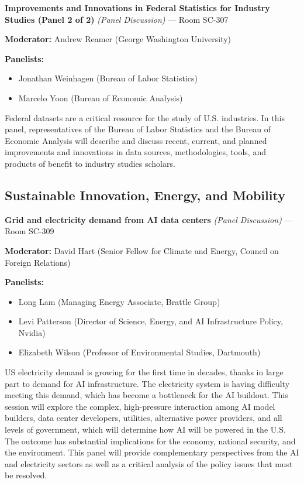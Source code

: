 \documentclass[
  10pt,
  letterpaper,
  DIV=11,
  numbers=noendperiod]{scrartcl}
\providecommand{\tightlist}{%
  \setlength{\itemsep}{0pt}\setlength{\parskip}{0pt}}\usepackage{longtable,booktabs,array}
\begin{document}
\textbf{Improvements and Innovations in Federal Statistics for Industry
Studies (Panel 2 of 2)} \emph{(Panel Discussion)} --- Room SC-307

\textbf{Moderator:} Andrew Reamer (George Washington University)

\textbf{Panelists:}

\begin{itemize}
\tightlist
\item
  Jonathan Weinhagen (Bureau of Labor Statistics)
\item
  Marcelo Yoon (Bureau of Economic Analysis)
\end{itemize}

Federal datasets are a critical resource for the study of U.S.
industries. In this panel, representatives of the Bureau of Labor
Statistics and the Bureau of Economic Analysis will describe and discuss
recent, current, and planned improvements and innovations in data
sources, methodologies, tools, and products of benefit to industry
studies scholars.

\subsection{\texorpdfstring{\textcolor{sustainability}{Sustainable Innovation, Energy, and Mobility}}{}}\label{section-39}

\textbf{Grid and electricity demand from AI data centers} \emph{(Panel
Discussion)} --- Room SC-309

\textbf{Moderator:} David Hart (Senior Fellow for Climate and Energy,
Council on Foreign Relations)

\textbf{Panelists:}

\begin{itemize}
\tightlist
\item
  Long Lam (Managing Energy Associate, Brattle Group)
\item
  Levi Patterson (Director of Science, Energy, and AI Infrastructure
  Policy, Nvidia)
\item
  Elizabeth Wilson (Professor of Environmental Studies, Dartmouth)
\end{itemize}

US electricity demand is growing for the first time in decades, thanks
in large part to demand for AI infrastructure. The electricity system is
having difficulty meeting this demand, which has become a bottleneck for
the AI buildout. This session will explore the complex, high-pressure
interaction among AI model builders, data center developers, utilities,
alternative power providers, and all levels of government, which will
determine how AI will be powered in the U.S. The outcome has substantial
implications for the economy, national security, and the environment.
This panel will provide complementary perspectives from the AI and
electricity sectors as well as a critical analysis of the policy issues
that must be resolved.
\end{document}
